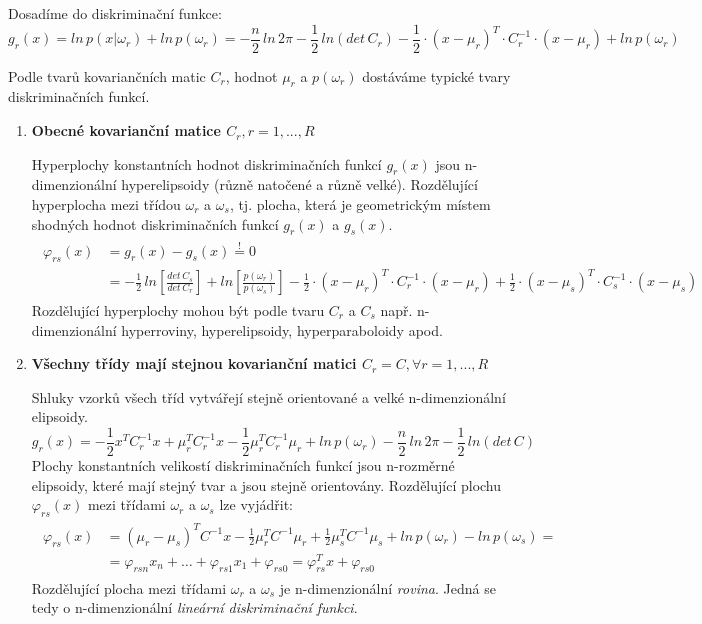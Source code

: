 Dosadíme do diskriminační funkce:
\begin{equation}
g_r(x) = ln \, p(x|\omega_r) + ln \, p(\omega_r) = - \frac{n}{2} \, ln \, 2\pi - \frac{1}{2} \, ln(det \, C_r) -\frac{1}{2} \cdot (x-\mu_r)^T \cdot C_r^{-1} \cdot (x-\mu_r) + ln \, p(\omega_r)
\end{equation}

Podle tvarů kovariančních matic $ C_r $, hodnot $ \mu_r $ a $ p(\omega_r) $ dostáváme typické tvary diskriminačních funkcí.

\begin{enumerate}
\item \textbf{Obecné kovarianční matice $ C_r, r=1,...,R $}

Hyperplochy konstantních hodnot diskriminačních funkcí $ g_r(x) $ jsou n-dimenzionální hyperelipsoidy (různě natočené a různě velké). Rozdělující hyperplocha mezi třídou $ \omega_r $ a $ \omega_s $, tj. plocha, která je geometrickým místem shodných hodnot diskriminačních funkcí $ g_r(x) $ a $ g_s(x) $.
\begin{align}
\begin{split}
\varphi_{rs}(x) &= g_r(x) - g_s(x) \overset{!}{=} 0 \\
&= -\frac{1}{2} \, ln\left[\frac{det \, C_s}{det \, C_r}\right] + ln\left[\frac{p(\omega_r)}{p(\omega_s)}\right] -\frac{1}{2} \cdot (x-\mu_r)^T \cdot C_r^{-1} \cdot (x-\mu_r) + \frac{1}{2} \cdot (x-\mu_s)^T \cdot C_s^{-1} \cdot (x-\mu_s)
\end{split}
\end{align}
Rozdělující hyperplochy mohou být podle tvaru $ C_r $ a $ C_s $ např. n-dimenzionální hyperroviny, hyperelipsoidy, hyperparaboloidy apod.

\item \textbf{Všechny třídy mají stejnou kovarianční matici $ C_r = C, \forall r=1,...,R $}

Shluky vzorků všech tříd vytvářejí stejně orientované a velké n-dimenzionální elipsoidy.
\begin{equation}
g_r(x) = -\frac{1}{2} x^T C_r^{-1} x + \mu_r^T C_r^{-1} x - \frac{1}{2} \mu_r^T C_r^{-1} \mu_r + ln \, p(\omega_r) - \frac{n}{2} \, ln \, 2\pi - \frac{1}{2} \, ln(det \, C)  
\end{equation}
Plochy konstantních velikostí diskriminačních funkcí jsou n-rozměrné elipsoidy, které mají stejný tvar a jsou stejně orientovány. Rozdělující plochu $ \varphi_{rs}(x) $ mezi třídami $ \omega_r $ a $ \omega_s $ lze vyjádřit:
\begin{align}
\begin{split}
\varphi_{rs}(x) &= (\mu_r - \mu_s)^T C^{-1} x - \frac{1}{2} \mu_r^T C^{-1} \mu_r + \frac{1}{2} \mu_s^T C^{-1} \mu_s + ln \, p(\omega_r) - ln \, p(\omega_s) = \\
&= \varphi_{rsn} x_n + \dots + \varphi_{rs1} x_1 + \varphi_{rs0} = \varphi_{rs}^T x + \varphi_{rs0}
\end{split}
\end{align}
Rozdělující plocha mezi třídami $ \omega_r $ a $ \omega_s $ je n-dimenzionální \textit{rovina}. Jedná se tedy o n-dimenzionální \textit{lineární diskriminační funkci}.


\end{enumerate}
